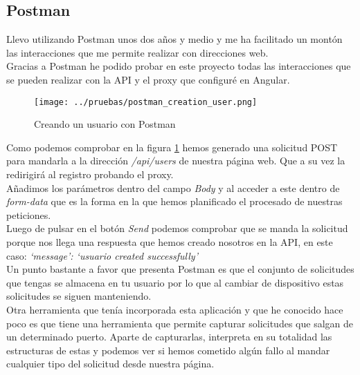 \subsection{Postman}
Llevo utilizando Postman unos dos años y medio y me ha facilitado un montón las interacciones que me permite realizar con direcciones web.
\\Gracias a Postman he podido probar en este proyecto todas las interacciones que se pueden realizar con la API y el proxy que configuré en Angular.
\begin{figure}[h]
    \centering
    \texttt{[image: ../pruebas/postman\_creation\_user.png]}
    \caption{Creando un usuario con Postman}\label{fig:postman-creation-user}
\end{figure}
Como podemos comprobar en la figura \ref{fig:postman-creation-user} hemos generado una solicitud POST para mandarla a la dirección \textit{/api/users} de nuestra página web. Que a su vez la redirigirá al registro probando el proxy.
\\Añadimos los parámetros dentro del campo \textit{Body} y al acceder a este dentro de \textit{form-data} que es la forma en la que hemos planificado el procesado de nuestras peticiones.
\\Luego de pulsar en el botón \textit{Send} podemos comprobar que se manda la solicitud porque nos llega una respuesta que hemos creado nosotros en la API, en este caso: \textit{`message': `usuario created successfully'}
\\Un punto bastante a favor que presenta Postman es que el conjunto de solicitudes que tengas se almacena en tu usuario por lo que al cambiar de dispositivo estas solicitudes se siguen manteniendo.
\\Otra herramienta que tenía incorporada esta aplicación y que he conocido hace poco es que tiene una herramienta que permite capturar solicitudes que salgan de un determinado puerto. Aparte de capturarlas, interpreta en su totalidad las estructuras de estas y podemos ver si hemos cometido algún fallo al mandar cualquier tipo del solicitud desde nuestra página.

